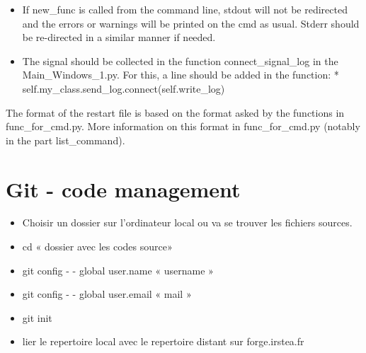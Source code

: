 \documentclass[letterpaper,10pt,english]{sphinxmanual}
\begin{document}
\begin{itemize}
\item {} 
If new\_func is called from the command line, stdout will not be redirected and the errors or warnings will be printed on the cmd as usual.  Stderr should be re-directed in a similar manner if needed.

\item {} 
The signal should be collected in the function connect\_signal\_log in the Main\_Windows\_1.py.  For this, a line should be added in the function:
*       self.my\_class.send\_log.connect(self.write\_log)

\end{itemize}


The format of the restart file is based on the format asked by the functions in func\_for\_cmd.py. More information on this format in func\_for\_cmd.py
(notably in the part list\_command).


\section{Git - code management}
\label{\detokenize{index:git-code-management}}
\begin{itemize}
\item {} 
Choisir un dossier sur l’ordinateur local ou va se trouver les fichiers sources.

\item {} 
cd  « dossier avec les codes source»

\item {} 
git config - - global user.name « username »

\item {} 
git config - - global user.email  « mail »

\item {} 
git init

\item {} 
lier le repertoire local avec le repertoire distant sur forge.irstea.fr

\end{itemize}
\end{document}
